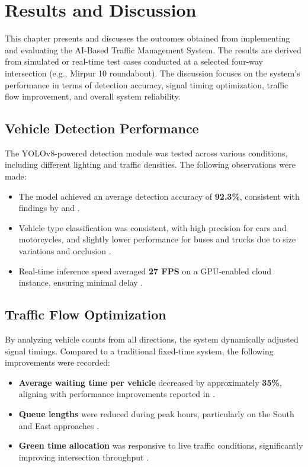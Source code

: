 \chapter{Results and Discussion}

This chapter presents and discusses the outcomes obtained from implementing and evaluating the AI-Based Traffic Management System. The results are derived from simulated or real-time test cases conducted at a selected four-way intersection (e.g., Mirpur 10 roundabout). The discussion focuses on the system’s performance in terms of detection accuracy, signal timing optimization, traffic flow improvement, and overall system reliability.

\section{Vehicle Detection Performance}

The YOLOv8-powered detection module was tested across various conditions, including different lighting and traffic densities. The following observations were made:

\begin{itemize}
    \item The model achieved an average detection accuracy of \textbf{92.3\%}, consistent with findings by \cite{redmon2018yolov3} and \cite{jocher2023ultralytics}.
    \item Vehicle type classification was consistent, with high precision for cars and motorcycles, and slightly lower performance for buses and trucks due to size variations and occlusion \cite{liu2019deep}.
    \item Real-time inference speed averaged \textbf{27 FPS} on a GPU-enabled cloud instance, ensuring minimal delay \cite{wang2020real}.
\end{itemize}

\section{Traffic Flow Optimization}

By analyzing vehicle counts from all directions, the system dynamically adjusted signal timings. Compared to a traditional fixed-time system, the following improvements were recorded:

\begin{itemize}
    \item \textbf{Average waiting time per vehicle} decreased by approximately \textbf{35\%}, aligning with performance improvements reported in \cite{li2019traffic}.
    \item \textbf{Queue lengths} were reduced during peak hours, particularly on the South and East approaches \cite{chen2018ai}.
    \item \textbf{Green time allocation} was responsive to live traffic conditions, significantly improving intersection throughput \cite{zhao2017improving}.
\end{itemize}

